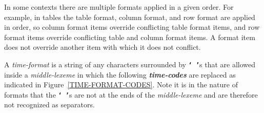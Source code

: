 \documentclass[12pt]{article}
\newcommand{\TT}[1]{{\tt \bfseries #1}}
\newcommand{\emkey}[1]{{\em \bfseries #1}}
\begin{document}
In some contexts
there are multiple formats applied in a given order.  For example,
in tables the table format, column format, and row format are applied in
order, so column format items override conflicting table format items,
and row format items override conflicting table and column format items.
A format item does not override another item with which it does not conflict.



A {\em time-format} is a string of any characters surrounded by
\TT{`~'}s that are
allowed inside a {\em middle-lexeme} in which the following \emkey{time-codes}
are replaced as indicated in Figure~\ref{TIME-FORMAT-CODES}.
Note it is in the nature of formats that the \TT{`~'}s are not at the
ends of the {\em middle-lexeme} and are therefore not recognized as
separators.
\end{document}
